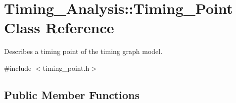 \hypertarget{classTiming__Analysis_1_1Timing__Point}{\section{Timing\-\_\-\-Analysis\-:\-:Timing\-\_\-\-Point Class Reference}
\label{classTiming__Analysis_1_1Timing__Point}
}


Describes a timing point of the timing graph model.  




{\ttfamily \#include $<$timing\-\_\-point.\-h$>$}

\subsection*{Public Member Functions}
